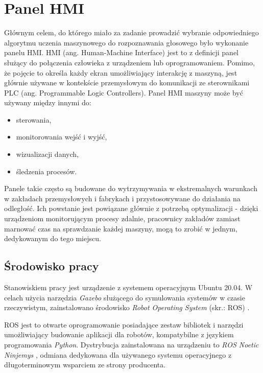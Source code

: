 \chapter{Panel HMI}
\label{cha:panelHmi}

Głównym celem, do którego miało za zadanie prowadzić wybranie odpowiedniego algorytmu uczenia maszynowego do rozpoznawania głosowego było wykonanie panelu HMI. HMI (ang. Human-Machine Interface) jest to z definicji panel służący do połączenia człowieka z urządzeniem lub oprogramowaniem. Pomimo, że pojęcie to określa każdy ekran umożliwiający interakcję z maszyną, jest głównie używane w kontekście przemysłowym do komunikacji ze sterownikami PLC (ang. Programmable Logic Controllers). 
Panel HMI maszyny może być używany między innymi do:
\begin{itemize}
    \item sterowania,
    \item monitorowania wejść i wyjść,
    \item wizualizacji danych,
    \item śledzenia procesów.
\end{itemize}
Panele takie często są budowane do wytrzymywania w ekstremalnych warunkach w zakładach przemysłowych i fabrykach i przystosowywane do działania na odległość. Ich powstanie jest powiązane głównie z potrzebą optymalizacji - dzięki urządzeniom monitorującym procesy zdalnie, pracownicy zakładów zamiast marnować czas na sprawdzanie każdej maszyny, mogą to zrobić w jednym, dedykowanym do tego miejscu. 


\section{Środowisko pracy}
\label{sec:srodPrac}

Stanowiskiem pracy jest urządzenie z systemem operacyjnym Ubuntu 20.04. W celach użycia narzędzia \textit{Gazebo} \cite{gazebo} służącego do symulowania systemów w czasie rzeczywistym, zainstalowano środowisko \textit{Robot Operating System} (skr.: ROS) \cite{ros}. 

ROS \cite{ros} jest to otwarte oprogramowanie posiadające zestaw bibliotek i narzędzi umożliwiający budowanie aplikacji dla robotów, kompatybilne z językiem programowania \textit{Python}. Dystrybucja zainstalowana na urządzeniu to \textit{ROS Noetic Ninjemys} \cite{noetic}, odmiana dedykowana dla używanego systemu operacyjnego z długoterminowym wsparciem ze strony producenta. 

